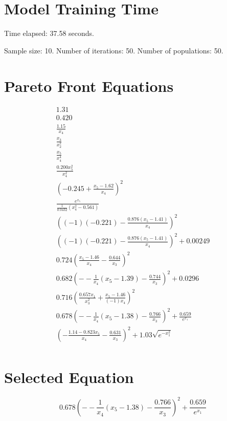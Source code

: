 \documentclass{article}
\begin{document}
\section*{Model Training Time}
Time elapsed: 37.58 seconds.

Sample size: 10.
Number of iterations: 50.
Number of populations: 50.

\section*{Pareto Front Equations}
\begin{align*}
1.31 \\
0.420 \\
\frac{1.15}{x_{4}} \\
\frac{x_{3}}{x_{2}^{2}} \\
\frac{x_{5}}{x_{4}^{4}} \\
\frac{0.200 x_{5}^{2}}{x_{4}^{2}} \\
\left(-0.245 + \frac{x_{5} - 1.62}{x_{4}}\right)^{2} \\
\frac{e^{x_{5}}}{\frac{1}{0.0432} \left(x_{4}^{2} - 0.561\right)} \\
\left(\left(-1\right) \left(-0.221\right) - \frac{0.876 \left(x_{5} - 1.41\right)}{x_{4}}\right)^{2} \\
\left(\left(-1\right) \left(-0.221\right) - \frac{0.876 \left(x_{5} - 1.41\right)}{x_{4}}\right)^{2} + 0.00249 \\
0.724 \left(\frac{x_{5} - 1.46}{x_{4}} - \frac{0.644}{x_{3}}\right)^{2} \\
0.682 \left(- - \frac{1}{x_{4}} \left(x_{5} - 1.39\right) - \frac{0.744}{x_{3}}\right)^{2} + 0.0296 \\
0.716 \left(\frac{0.657 x_{1}}{x_{3}^{2}} + \frac{x_{5} - 1.46}{\left(-1\right) x_{4}}\right)^{2} \\
0.678 \left(- - \frac{1}{x_{4}} \left(x_{5} - 1.38\right) - \frac{0.766}{x_{3}}\right)^{2} + \frac{0.659}{e^{x_{1}}} \\
\left(- \frac{1.14 - 0.823 x_{5}}{x_{4}} - \frac{0.631}{x_{3}}\right)^{2} + 1.03 \sqrt{e^{- x_{1}^{2}}} \\
\end{align*}

\section*{Selected Equation}
\[ 0.678 \left(- - \frac{1}{x_{4}} \left(x_{5} - 1.38\right) - \frac{0.766}{x_{3}}\right)^{2} + \frac{0.659}{e^{x_{1}}} \]
\end{document}
